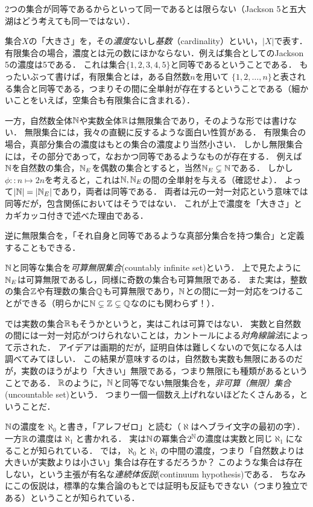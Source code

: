 \documentclass[11pt,a4paper]{jsarticle} %
\begin{document}
\begin{attn}
 2つの集合が同等であるからといって同一であるとは限らない（Jackson 5と五大湖はどう考えても同一ではない）．
\end{attn}

集合$X$の「大きさ」を，その\emph{濃度}ないし\emph{基数}（cardinality）といい，$|X|$で表す．
有限集合の場合，濃度とは元の数にほかならない．例えば集合としてのJackson 5の濃度は5である．
これは集合$\{1, 2, 3, 4, 5\}$と同等であるということである．
もったいぶって書けば，有限集合とは，ある自然数$n$を用いて $\{1, 2, \dots, n\}$と表される集合と同等である，つまりその間に全単射が存在するということである（細かいことをいえば，空集合も有限集合に含まれる）．

一方，自然数全体$\mathbb{N}$や実数全体$\mathbb{R}$は無限集合であり，そのような形では書けない．
無限集合には，我々の直観に反するような面白い性質がある．
有限集合の場合，真部分集合の濃度はもとの集合の濃度より当然小さい．
しかし無限集合には，その部分であって，なおかつ同等であるようなものが存在する．
例えば$\mathbb{N}$を自然数の集合，$\mathbb{N}_E$を偶数の集合とすると，当然$\mathbb{N}_E \subsetneq \mathbb{N}$である．
しかし$\phi::n \mapsto 2n$を考えると，これは$\mathbb{N}, \mathbb{N}_E$の間の全単射を与える（確認せよ）．
よって$|\mathbb{N}| = |\mathbb{N}_E|$であり，両者は同等である．
両者は元の一対一対応という意味では同等だが，包含関係においてはそうではない．
これが上で濃度を「大きさ」とカギカッコ付きで述べた理由である．

逆に無限集合を，「それ自身と同等であるような真部分集合を持つ集合」と定義することもできる．

$\mathbb{N}$と同等な集合を\emph{可算無限集合}(countably infinite set)という．
上で見たように$\mathbb{N}_E$は可算無限であるし，同様に奇数の集合も可算無限である．
また実は，整数の集合$\mathbb{Z}$や有理数の集合$\mathbb{Q}$も可算無限であり，$\mathbb{N}$との間に一対一対応をつけることができる（明らかに$\mathbb{N} \subsetneq \mathbb{Z} \subsetneq \mathbb{Q}$なのにも関わらず！）．

では実数の集合$\mathbb{R}$もそうかというと，実はこれは可算ではない．
実数と自然数の間には一対一対応がつけられないことは，カントールによる\emph{対角線論法}によって示された．
アイデアは画期的だが，証明自体は難しくないので気になる人は調べてみてほしい．
この結果が意味するのは，自然数も実数も無限にあるのだが，実数のほうがより「大きい」無限である，つまり無限にも種類があるということである．
$\mathbb{R}$のように，$\mathbb{N}$と同等でない無限集合を，\emph{非可算（無限）集合}(uncountable set)という．
つまり一個一個数え上げれないほどたくさんある，ということだ．

\begin{develop}
 $\mathbb{N}$の濃度を$\aleph_0$と書き，「アレフゼロ」と読む（$\aleph$はヘブライ文字の最初の字）．
一方$\mathbb{R}$の濃度は$\aleph_1$と書かれる．
実は$\mathbb{N}$の冪集合$2^{\mathbb{N}}$の濃度は実数と同じ$\aleph_1$になることが知られている．
では，$\aleph_0$と$\aleph_1$の中間の濃度，つまり「自然数よりは大きいが実数よりは小さい」集合は存在するだろうか？
このような集合は存在しない，という主張が有名な\emph{連続体仮説}(continuum hypothesis)である．
ちなみにこの仮説は，標準的な集合論のもとでは証明も反証もできない（つまり独立である）ということが知られている．
\end{develop}
\end{document}
